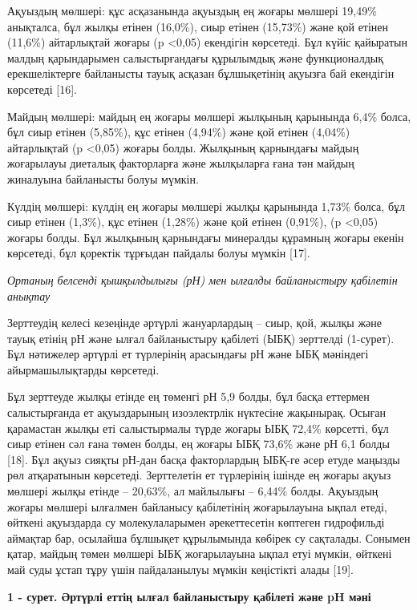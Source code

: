 \begin{multicols}{2}
Ақуыздың мөлшері: құс асқазанында ақуыздың ең жоғары мөлшері 19,49\%
анықталса, бұл жылқы етінен (16,0\%), сиыр етінен (15,73\%) және қой
етінен (11,6\%) айтарлықтай жоғары (p \textless0,05) екендігін
көрсетеді. Бұл күйіс қайыратын малдың қарындарымен салыстырғандағы
құрылымдық және функционалдық ерекшеліктерге байланысты тауық асқазан
бұлшықетінің ақуызға бай екендігін көрсетеді {[}16{]}.

Майдың мөлшері: майдың ең жоғары мөлшері жылқының қарынында 6,4\% болса,
бұл сиыр етінен (5,85\%), құс етінен (4,94\%) және қой етінен (4,04\%)
айтарлықтай (p \textless0,05) жоғары болды. Жылқының қарнындағы майдың
жоғарылауы диеталық факторларға және жылқыларға ғана тән майдың
жиналуына байланысты болуы мүмкін.

Күлдің мөлшері: күлдің ең жоғары мөлшері жылқы қарынында 1,73\% болса,
бұл сиыр етінен (1,3\%), құс етінен (1,28\%) және қой етінен (0,91\%),
(p \textless0,05) жоғары болды. Бұл жылқының қарнындағы минералды
құрамның жоғары екенін көрсетеді, бұл қоректік тұрғыдан пайдалы болуы
мүмкін {[}17{]}.

\emph{Ортаның белсенді қышқылдылығы (рН) мен ылғалды байланыстыру
қабілетін анықтау}

Зерттеудің келесі кезеңінде әртүрлі жануарлардың -- сиыр, қой, жылқы
және тауық етінің рН және ылғал байланыстыру қабілеті (ЫБҚ) зерттелді
(1-сурет). Бұл нәтижелер әртүрлі ет түрлерінің арасындағы рН және ЫБҚ
мәніндегі айырмашылықтарды көрсетеді.

Бұл зерттеуде жылқы етінде ең төменгі рН 5,9 болды, бұл басқа еттермен
салыстырғанда ет ақуыздарының изоэлектрлік нүктесіне жақынырақ. Осыған
қарамастан жылқы еті салыстырмалы түрде жоғары ЫБҚ 72,4\% көрсетті, бұл
сиыр етінен сәл ғана төмен болды, ең жоғары ЫБҚ 73,6\% және рН 6,1 болды
{[}18{]}. Бұл ақуыз сияқты рН-дан басқа факторлардың ЫБҚ-ге әсер етуде
маңызды рөл атқаратынын көрсетеді. Зерттелетін ет түрлерінің ішінде ең
жоғары ақуыз мөлшері жылқы етінде -- 20,63\%, ал майлылығы -- 6,44\%
болды. Ақуыздың жоғары мөлшері ылғалмен байланысу қабілетінің
жоғарылауына ықпал етеді, өйткені ақуыздарда су молекулаларымен
әрекеттесетін көптеген гидрофильді аймақтар бар, осылайша бұлшықет
құрылымында көбірек су сақталады. Сонымен қатар, майдың төмен мөлшері
ЫБҚ жоғарылауына ықпал етуі мүмкін, өйткені май суды ұстап тұру үшін
пайдаланылуы мүмкін кеңістікті алады {[}19{]}.
\end{multicols}

{\bfseries 1 - сурет. Әртүрлі еттің ылғал байланыстыру қабілеті және pH мәні}

